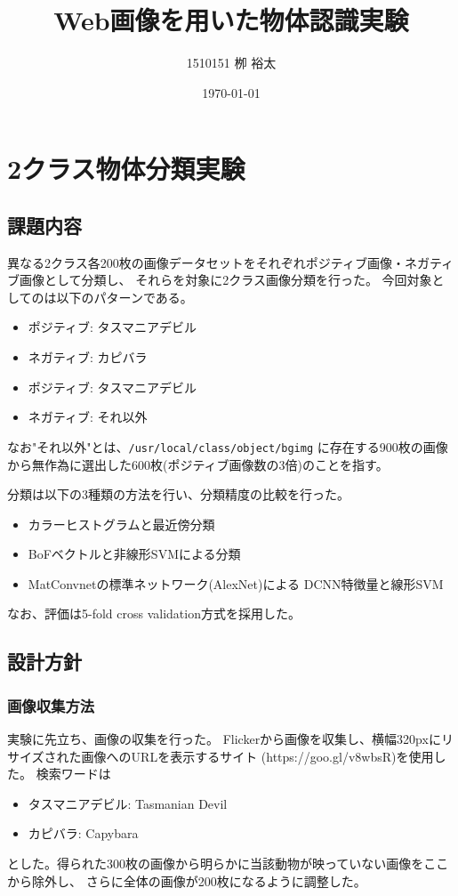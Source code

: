 \documentclass[11pt,a4paper, uplatex]{jsreport}
\title{Web画像を用いた物体認識実験}
\author{1510151  栁 裕太}
\date{\today}
\begin{document}
\maketitle
\thispagestyle{empty}
\tableofcontents
\chapter{2クラス物体分類実験}
\section{課題内容}
異なる2クラス各200枚の画像データセットをそれぞれポジティブ画像・ネガティブ画像として分類し、
それらを対象に2クラス画像分類を行った。
今回対象としてのは以下のパターンである。
\begin{itemize}
  \item ポジティブ: タスマニアデビル
  \item ネガティブ: カピバラ
\end{itemize}
\begin{itemize}
  \item ポジティブ: タスマニアデビル
  \item ネガティブ: それ以外
\end{itemize}
なお"それ以外"とは、\texttt{/usr/local/class/object/bgimg}
に存在する900枚の画像から無作為に選出した600枚(ポジティブ画像数の3倍)のことを指す。

分類は以下の3種類の方法を行い、分類精度の比較を行った。
\begin{itemize}
  \item カラーヒストグラムと最近傍分類
  \item BoFベクトルと非線形SVMによる分類
  \item MatConvnetの標準ネットワーク(AlexNet)による DCNN特徴量と線形SVM
\end{itemize}

なお、評価は5-fold cross validation方式を採用した。

\section{設計方針}
\subsection{画像収集方法}\label{sec:collectimg}
実験に先立ち、画像の収集を行った。
Flickerから画像を収集し、横幅320pxにリサイズされた画像へのURLを表示するサイト
(https://goo.gl/v8wbsR)を使用した。
検索ワードは
\begin{itemize}
  \item タスマニアデビル: Tasmanian Devil
  \item カピバラ: Capybara
\end{itemize}
とした。得られた300枚の画像から明らかに当該動物が映っていない画像をここから除外し、
さらに全体の画像が200枚になるように調整した。
\end{document}
